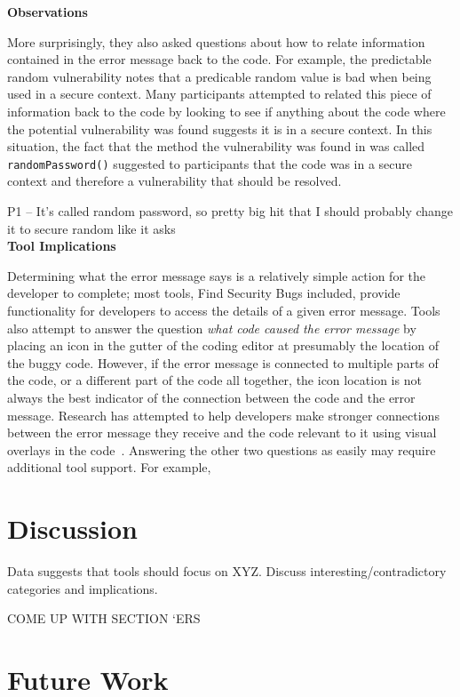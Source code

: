 \documentclass[conference]{IEEEtran}
\begin{document}
\noindent\textbf{Observations}

More surprisingly, they also asked questions about how to relate information contained in the error message back to the code. 
For example, the predictable random vulnerability notes that a predicable random value is bad when being used in a secure context. 
Many participants attempted to related this piece of information back to the code by looking to see if anything about the code where the potential vulnerability was found suggests it is in a secure context. 
In this situation, the fact that the method the vulnerability was found in was called \texttt{randomPassword()} suggested to participants that the code was in a secure context and therefore a vulnerability that should be resolved.

P1 -- It's called random password, so pretty big hit that I should probably change it to secure random like it asks
\\

\noindent\textbf{Tool Implications}

Determining what the error message says is a relatively simple action for the developer to complete; most tools, Find Security Bugs included, provide functionality for developers to access the details of a given error message. 
Tools also attempt to answer the question \emph{what code caused the error message} by placing an icon in the gutter of the coding editor at presumably the location of the buggy code. 
However, if the error message is connected to multiple parts of the code, or a different part of the code all together, the icon location is not always the best indicator of the connection between the code and the error message. 
Research has attempted to help developers make stronger connections between the error message they receive and the code relevant to it using visual overlays in the code~\cite{barik14visual}.
Answering the other two questions as easily may require additional tool support. For example, 


\section{Discussion}
\label{sec:disc}
Data suggests that tools should focus on XYZ. Discuss interesting/contradictory categories and implications.

COME UP WITH SECTION `ERS


\section{Future Work}
\label{sec:fw}
\end{document}
